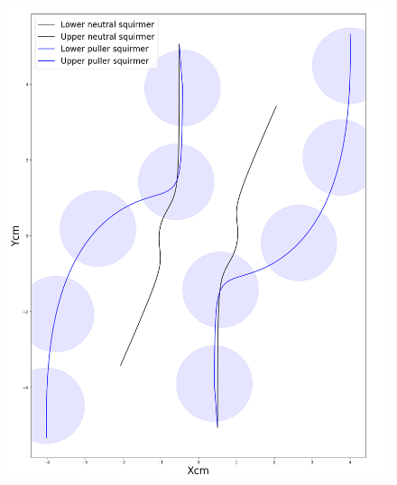 \documentclass[graybox]{svmult}
\begin{document}
\begin{figure}
	\centering

    \includegraphics[scale=0.2]{Figures/squirmer/squirmer.png}
    

\end{figure}
\end{document}
